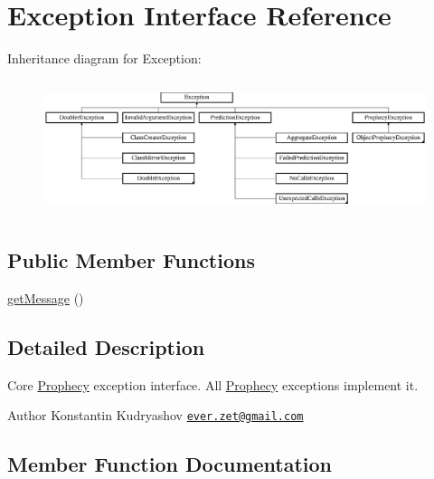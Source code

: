\hypertarget{interface_prophecy_1_1_exception_1_1_exception}{}\section{Exception Interface Reference}
\label{interface_prophecy_1_1_exception_1_1_exception}
Inheritance diagram for Exception\+:\begin{figure}[H]
\begin{center}
\leavevmode
\includegraphics[height=3.976331cm]{interface_prophecy_1_1_exception_1_1_exception}
\end{center}
\end{figure}
\subsection*{Public Member Functions}
\begin{DoxyCompactItemize}
\item 
\mbox{\hyperlink{interface_prophecy_1_1_exception_1_1_exception_a0b0e611236742aac18ba1936d03ba89a}{get\+Message}} ()
\end{DoxyCompactItemize}


\subsection{Detailed Description}
Core \mbox{\hyperlink{namespace_prophecy_1_1_exception_1_1_prophecy}{Prophecy}} exception interface. All \mbox{\hyperlink{namespace_prophecy_1_1_exception_1_1_prophecy}{Prophecy}} exceptions implement it.

\begin{DoxyAuthor}{Author}
Konstantin Kudryashov \href{mailto:ever.zet@gmail.com}{\tt ever.\+zet@gmail.\+com} 
\end{DoxyAuthor}


\subsection{Member Function Documentation}
\mbox{\label{interface_prophecy_1_1_exception_1_1_exception_a0b0e611236742aac18ba1936d03ba89a}} 
